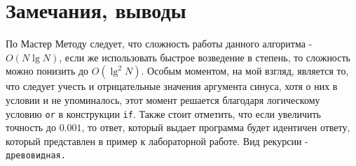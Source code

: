 \documentclass[12pt]{article}
\begin{document}
\section{Замечания, выводы}
По Мастер Методу следует, что сложность работы данного алгоритма - $O(N\lg{N})$, если же использовать быстрое возведение в степень, то сложность можно понизить до $O(\lg^2N)$. Особым моментом, на мой взгляд, является то, что следует учесть и отрицательные значения аргумента синуса, хотя о них в условии и не упоминалось, этот момент решается благодаря логическому условию {\tt or} в конструкции {\tt if}. Также стоит отметить, что если увеличить точность до $0.001$, то ответ, который выдает программа будет идентичен ответу, который представлен в пример к лабораторной работе. Вид рекурсии - \tt{древовидная}.
\end{document}
